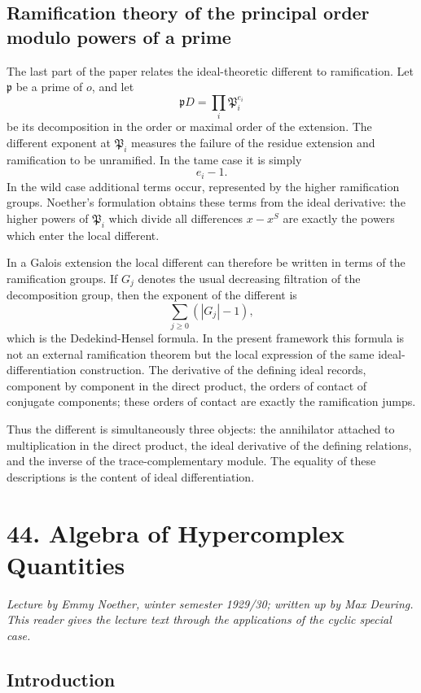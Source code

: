 \documentclass[11pt]{article}
\begin{document}
\subsection{Ramification theory of the principal order modulo powers of a prime}

The last part of the paper relates the ideal-theoretic different to ramification. Let \(\mathfrak p\) be a prime of \(o\), and let
\[
  \mathfrak pD=\prod_i \mathfrak P_i^{e_i}
\]
be its decomposition in the order or maximal order of the extension. The different exponent at \(\mathfrak P_i\) measures the failure of the residue extension and ramification to be unramified. In the tame case it is simply
\[
  e_i-1.
\]
In the wild case additional terms occur, represented by the higher ramification groups. Noether's formulation obtains these terms from the ideal derivative: the higher powers of \(\mathfrak P_i\) which divide all differences \(x-x^S\) are exactly the powers which enter the local different.

In a Galois extension the local different can therefore be written in terms of the ramification groups. If \(G_j\) denotes the usual decreasing filtration of the decomposition group, then the exponent of the different is
\[
  \sum_{j\ge0} (|G_j|-1),
\]
which is the Dedekind-Hensel formula. In the present framework this formula is not an external ramification theorem but the local expression of the same ideal-differentiation construction. The derivative of the defining ideal records, component by component in the direct product, the orders of contact of conjugate components; these orders of contact are exactly the ramification jumps.

Thus the different is simultaneously three objects: the annihilator attached to multiplication in the direct product, the ideal derivative of the defining relations, and the inverse of the trace-complementary module. The equality of these descriptions is the content of ideal differentiation.


\clearpage
\section{44. Algebra of Hypercomplex Quantities}

\textit{Lecture by Emmy Noether, winter semester 1929/30; written up by Max Deuring. This reader gives the lecture text through the applications of the cyclic special case.}

\subsection{Introduction}
\end{document}
